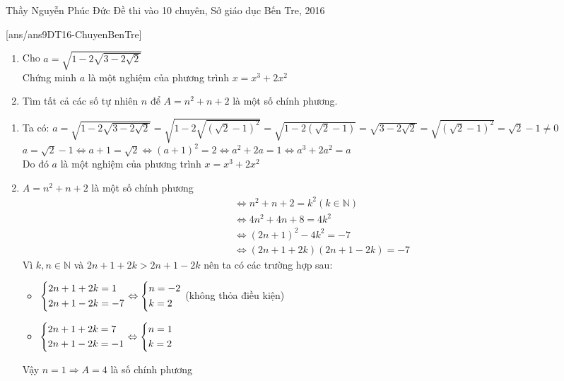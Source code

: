 \begin{name}
{Thầy  Nguyễn Phúc Đức}
{Đề thi vào 10 chuyên, Sở giáo dục Bến Tre, 2016}
\end{name}
\setcounter{ex}{0}
[ans/ans9DT16-ChuyenBenTre]
\begin{ex}%
    \hfill
    \begin{enumerate}
        \item Cho $a=\sqrt{1-2\sqrt{3-2\sqrt{2}}}$\\
        Chứng minh $a$ là một nghiệm của phương trình $x=x^3+2x^2$
        \item Tìm tất cả các số tự nhiên $n$ để $A=n^2+n+2$ là một số chính phương.
    \end{enumerate}
\loigiai
    {
    	\hfill
    \begin{enumerate}
        \item Ta có: $a=\sqrt{1-2\sqrt{3-2\sqrt{2}}}=\sqrt{1-2\sqrt{\left(\sqrt{2}-1\right)^2}}=\sqrt{1-2\left(\sqrt{2}-1\right)}=\sqrt{3-2\sqrt{2}}=\sqrt{\left(\sqrt{2}-1\right)^2}=\sqrt{2}-1\neq 0$\\
        $a=\sqrt{2}-1\Leftrightarrow a+1=\sqrt{2}\Leftrightarrow \left(a+1\right)^2=2\Leftrightarrow a^2+2a=1\Leftrightarrow a^3+2a^2=a$\\
        Do đó $a$ là một nghiệm của phương trình $x=x^3+2x^2$
        \item  $A=n^2+n+2$ là một số chính phương
        \begin{align*}
        &\Leftrightarrow n^2+n+2=k^2 (k\in\mathbb{N})\\
        &\Leftrightarrow 4n^2+4n+8=4k^2\\
        &\Leftrightarrow (2n+1)^2-4k^2=-7\\
        &\Leftrightarrow (2n+1+2k)(2n+1-2k)=-7
        \end{align*} 
        Vì $k,n\in\mathbb{N}$ và $2n+1+2k>2n+1-2k$ nên ta có các trường hợp sau: 
        \hfill
        \begin{itemize}
        	\item $\left\{\begin{aligned}&2n+1+2k=1\\&2n+1-2k=-7\end{aligned}\right.\Leftrightarrow \left\{\begin{aligned}&n=-2\\&k=2\end{aligned}\right.$ (không thỏa điều kiện)
        	\item $\left\{\begin{aligned}&2n+1+2k=7\\&2n+1-2k=-1\end{aligned}\right.\Leftrightarrow \left\{\begin{aligned}&n=1\\&k=2\end{aligned}\right.$
        \end{itemize}
    Vậy $n=1\Rightarrow A=4$ là số chính phương
    \end{enumerate}
    }
\end{ex}

